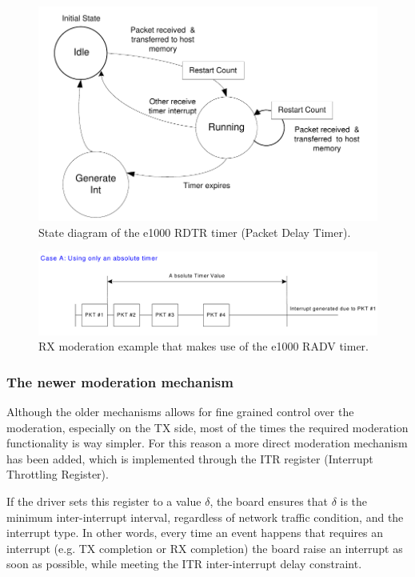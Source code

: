\begin{figure}[bt]
\centering
\includegraphics[scale = 0.45]{rdtr-state.png}
\caption{State diagram of the e1000 RDTR timer (Packet Delay Timer).}
\label{fig:rdtrstate}
\end{figure}

\begin{figure}[bt]
\centering
\includegraphics[scale = 0.45]{radv-only.png}
\caption{RX moderation example that makes use of the e1000 RADV timer.}
\label{fig:radvonly}
\end{figure}

\subsubsection{The newer moderation mechanism}
\label{sec:itrmit}
Although the older mechanisms allows for fine grained control over the moderation, especially on the TX side, most of the times the 
required moderation functionality is way simpler. For this reason a more direct moderation mechanism has been added, which is implemented
through the ITR register (Interrupt Throttling Register).

If the driver sets this register to a value $\delta$, the board ensures that $\delta$ is the minimum inter-interrupt interval, regardless of
network traffic condition, and the interrupt type.
In other words, every time an event happens that requires an interrupt (e.g. TX completion or RX completion) the board raise an interrupt
as soon as possible, while meeting the ITR inter-interrupt delay constraint.

